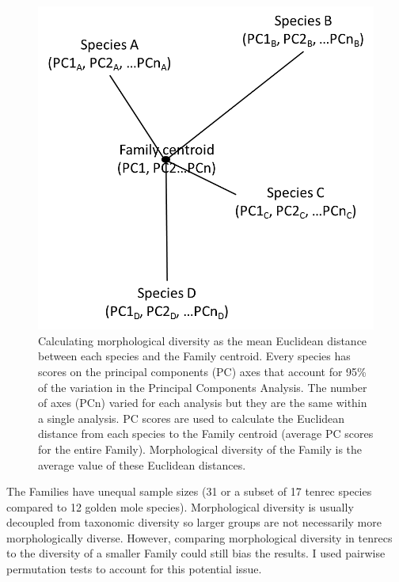 	\begin{figure}[!htbp]
	\centering
	\includegraphics [width=0.7\linewidth, height=0.7\textheight, keepaspectratio]{Disparity/writing/figures/Centroids.png}
	\caption[Calculating diversity as mean Euclidean distance to Family centroid.]
		{Calculating morphological diversity as the mean Euclidean distance between each species and the Family centroid. Every species has scores on the principal components (PC) axes that account for 95\% of the variation in the Principal Components Analysis. The number of axes (PCn) varied for each analysis but they are the same within a single analysis. PC scores are used to calculate the Euclidean distance from each species to the Family centroid (average PC scores for the entire Family). Morphological diversity of the Family is the average value of these Euclidean distances.}
	\label{fig:centroids}
	\end{figure}
	

	
	The Families have unequal sample sizes (31 or a subset of 17 tenrec species compared to 12 golden mole species). Morphological diversity is usually decoupled from taxonomic diversity \citep[e.g.][]{Ruta2013, Hopkins2013} so larger groups are not necessarily more morphologically diverse. However, comparing morphological diversity in tenrecs to the diversity of a smaller Family could still bias the results. I used pairwise permutation tests to account for this potential issue. 



